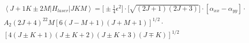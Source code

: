 \documentclass{article}
\newcommand{\ket}[1]{\left |{#1}\right \rangle}
\newcommand{\bra}[1]{\left \langle {#1}\right |}
\begin{document}
\begin{align*}
  \bra{J+1K\pm2M}H_{laser}\ket{JKM}=\bigg[ \pm\frac{1}{4}\epsilon^2 \bigg] \cdot \bigg[ \sqrt{(2J+1)(2J+3)}\bigg] \cdot[\alpha_{xx}-\alpha_{yy}]\cdot\\A_2(2J+4)^22M[6(J-M+1)(J+M+1)]^{1/2}\cdot\\ [4(J\pm K+1)(J\pm K+2)(J\pm K+3)(J\mp K)]^{1/2}
\end{align*}
\end{document}
